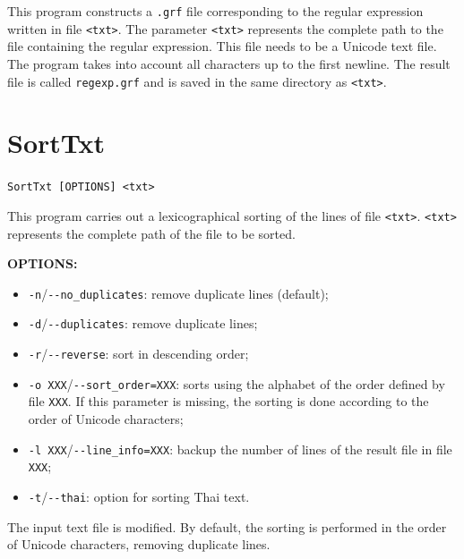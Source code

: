 \bigskip
\noindent {}This 
program constructs a \verb+.grf+ file corresponding to the regular
expression written in file \verb+<txt>+. The parameter \verb+<txt>+ represents the
complete path to the file containing the regular expression. This file needs to
be a Unicode text file. The program takes into account all characters up to the
first newline. The result file is called \verb+regexp.grf+ and is saved in the
same directory as \verb+<txt>+.







\section{SortTxt}

\verb+SortTxt [OPTIONS] <txt>+

\bigskip
\noindent This program carries out a lexicographical sorting of the lines of file
\verb+<txt>+. \verb+<txt>+ represents the complete path of the file to be sorted.

\bigskip
\noindent \textbf{OPTIONS:}
\begin{itemize}
  \item \verb+-n+/\verb+--no_duplicates+: remove duplicate lines (default);

  \item \verb+-d+/\verb+--duplicates+: remove duplicate lines;

  \item \verb+-r+/\verb+--reverse+: sort in descending order;

  \item \verb+-o XXX+/\verb+--sort_order=XXX+: sorts using the alphabet of the
  order defined by file \verb+XXX+. If this parameter is missing, the sorting is done according to the
  order of Unicode characters;

  \item \verb+-l XXX+/\verb+--line_info=XXX+: backup the number of lines of the result file in
  file \verb+XXX+;
  
  \item \verb+-t+/\verb+--thai+: option for sorting Thai text.
\end{itemize}

\bigskip
\noindent The input text file is modified. By default,
the sorting is performed in the order of Unicode characters, removing duplicate lines.








